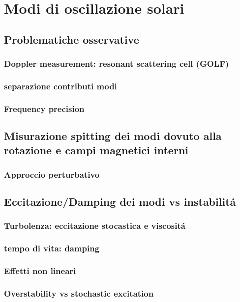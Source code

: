 \documentclass[../main.tex]{subfiles}
\begin{document}
\chapter{Modi di oscillazione solari}

\begin{refsection}
\nocite{*}
\begingroup
\let\clearpage\relax
\printbibliography
\endgroup

\section{Problematiche osservative}

\subsection{Doppler measurement: resonant scattering cell (GOLF)}

\subsection{separazione contributi modi}

\subsection{Frequency precision}

\section{Misurazione spitting dei modi dovuto alla rotazione e campi magnetici interni}

\subsection{Approccio perturbativo}


\section{Eccitazione/Damping dei modi vs instabilit\'a}

\subsection{Turbolenza: eccitazione stocastica e viscosit\'a}

\subsection{tempo di vita: damping}

\subsection{Effetti non lineari}

\subsection{Overstability vs stochastic excitation}

\end{refsection}
\end{document}
